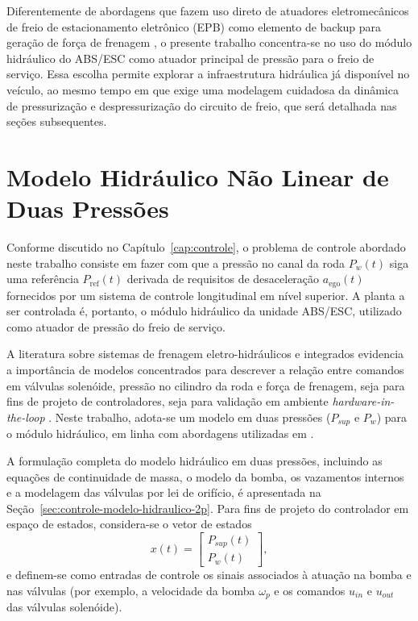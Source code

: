 Diferentemente de abordagens que fazem uso direto de atuadores eletromecânicos de freio de estacionamento eletrônico (EPB) como elemento de backup para geração de força de frenagem \cite{HouhuaJingShihao2023}, o presente trabalho concentra-se no uso do módulo hidráulico do ABS/ESC como atuador principal de pressão para o freio de serviço. Essa escolha permite explorar a infraestrutura hidráulica já disponível no veículo, ao mesmo tempo em que exige uma modelagem cuidadosa da dinâmica de pressurização e despressurização do circuito de freio, que será detalhada nas seções subsequentes.

\section{Modelo Hidráulico Não Linear de Duas Pressões}
\label{sec:controle-4-1}

Conforme discutido no Capítulo~\ref{cap:controle}, o problema de controle abordado neste trabalho consiste em fazer com que a pressão no canal da roda $P_w(t)$ siga uma referência $P_{\mathrm{ref}}(t)$ derivada de requisitos de desaceleração $a_{\mathrm{ego}}(t)$ fornecidos por um sistema de controle longitudinal em nível superior. A planta a ser controlada é, portanto, o módulo hidráulico da unidade ABS/ESC, utilizado como atuador de pressão do freio de serviço.

A literatura sobre sistemas de frenagem eletro-hidráulicos e integrados evidencia a importância de modelos concentrados para descrever a relação entre comandos em válvulas solenóide, pressão no cilindro da roda e força de frenagem, seja para fins de projeto de controladores, seja para validação em ambiente \emph{hardware-in-the-loop} \cite{HouhuaJing2022,PressureCoordinatedControl2023,ZengYangHuang2023,MotorParametricDesign2023}. Neste trabalho, adota-se um modelo em duas pressões ($P_{sup}$ e $P_w$) para o módulo hidráulico, em linha com abordagens utilizadas em .

A formulação completa do modelo hidráulico em duas pressões, incluindo as equações de continuidade de massa, o modelo da bomba, os vazamentos internos e a modelagem das válvulas por lei de orifício, é apresentada na Seção~\ref{sec:controle-modelo-hidraulico-2p}. Para fins de projeto do controlador em espaço de estados, considera-se o vetor de estados
\begin{equation}
    x(t) = 
    \begin{bmatrix}
        P_{sup}(t) \\
        P_{w}(t)
    \end{bmatrix},
    \label{eq:vect-estados-hidraulico}
\end{equation}
e definem-se como entradas de controle os sinais associados à atuação na bomba e nas válvulas (por exemplo, a velocidade da bomba $\omega_p$ e os comandos $u_{in}$ e $u_{out}$ das válvulas solenóide). 

